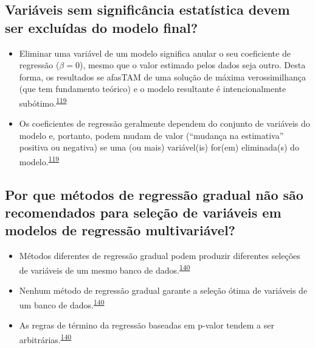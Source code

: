 \documentclass[
  a4paper,
]{book}
\begin{document}
\hypertarget{variuxe1veis-sem-significuxe2ncia-estatuxedstica-devem-ser-excluuxeddas-do-modelo-final}{%
\subsection{Variáveis sem significância estatística devem ser excluídas do modelo final?}\label{variuxe1veis-sem-significuxe2ncia-estatuxedstica-devem-ser-excluuxeddas-do-modelo-final}}

\begin{itemize}
\item
  Eliminar uma variável de um modelo significa anular o seu coeficiente de regressão (\(\beta = 0\)), mesmo que o valor estimado pelos dados seja outro. Desta forma, os resultados se afasTAM de uma solução de máxima verossimilhança (que tem fundamento teórico) e o modelo resultante é intencionalmente subótimo.\textsuperscript{\protect\hyperlink{ref-heinze2016}{119}}
\item
  Os coeficientes de regressão geralmente dependem do conjunto de variáveis do modelo e, portanto, podem mudam de valor (``mudança na estimativa'' positiva ou negativa) se uma (ou mais) variável(is) for(em) eliminada(s) do modelo.\textsuperscript{\protect\hyperlink{ref-heinze2016}{119}}
\end{itemize}

\hypertarget{por-que-muxe9todos-de-regressuxe3o-gradual-nuxe3o-suxe3o-recomendados-para-seleuxe7uxe3o-de-variuxe1veis-em-modelos-de-regressuxe3o-multivariuxe1vel}{%
\subsection{Por que métodos de regressão gradual não são recomendados para seleção de variáveis em modelos de regressão multivariável?}\label{por-que-muxe9todos-de-regressuxe3o-gradual-nuxe3o-suxe3o-recomendados-para-seleuxe7uxe3o-de-variuxe1veis-em-modelos-de-regressuxe3o-multivariuxe1vel}}

\begin{itemize}
\item
  Métodos diferentes de regressão gradual podem produzir diferentes seleções de variáveis de um mesmo banco de dados.\textsuperscript{\protect\hyperlink{ref-Healy1995}{140}}
\item
  Nenhum método de regressão gradual garante a seleção ótima de variáveis de um banco de dados.\textsuperscript{\protect\hyperlink{ref-Healy1995}{140}}
\item
  As regras de término da regressão baseadas em p-valor tendem a ser arbitrárias.\textsuperscript{\protect\hyperlink{ref-Healy1995}{140}}
\end{itemize}
\end{document}
